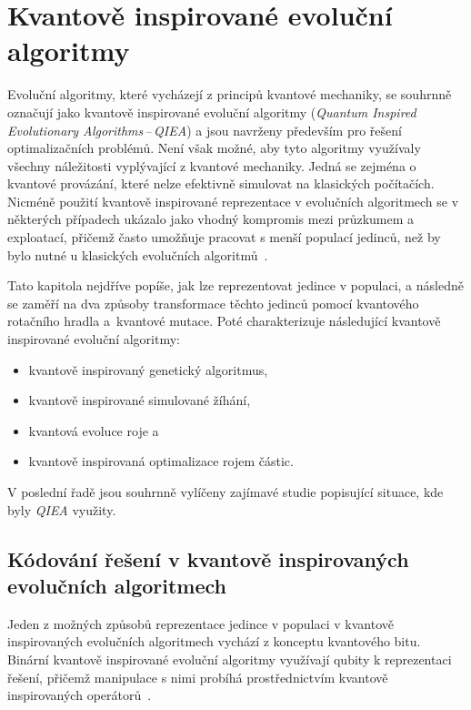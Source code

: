 \chapter{Kvantově inspirované evoluční algoritmy} \label{chapt:qiea}
Evoluční algoritmy, které vycházejí z principů kvantové mechaniky, se souhrnně označují jako kvantově inspirované evoluční algoritmy (\emph{Quantum Inspired Evolutionary Algorithms\,--\,QIEA}) a jsou navrženy především pro řešení optimalizačních problémů. 
Není však možné, aby tyto algoritmy využívaly všechny náležitosti vyplývající z kvantové mechaniky. 
Jedná se zejména o kvantové provázání, které nelze efektivně simulovat na klasických počítačích. 
Nicméně použití kvantově inspirované reprezentace v evolučních algoritmech se v některých případech ukázalo jako vhodný kompromis mezi průzkumem a exploatací, přičemž často umožňuje pracovat s menší populací jedinců, než by bylo nutné u klasických evolučních algoritmů~\cite{NaturalComputing}.

Tato kapitola nejdříve popíše, jak lze reprezentovat jedince v populaci, a následně se zaměří na dva způsoby transformace těchto jedinců pomocí kvantového rotačního hradla a~kvantové mutace. 
Poté charakterizuje následující kvantově inspirované evoluční algoritmy:
\begin{itemize}
    \item kvantově inspirovaný genetický algoritmus,
    \item kvantově inspirované simulované žíhání,
    \item kvantová evoluce roje a
    \item kvantově inspirovaná optimalizace rojem částic.
\end{itemize}
V poslední řadě jsou souhrnně vylíčeny zajímavé studie popisující situace, kde byly \emph{QIEA} využity. 

\section{Kódování řešení v kvantově inspirovaných evolučních algoritmech}
Jeden z možných způsobů reprezentace jedince v populaci v kvantově inspirovaných evolučních algoritmech vychází z konceptu kvantového bitu. 
Binární kvantově inspirované evoluční algoritmy využívají qubity k reprezentaci řešení, přičemž manipulace s nimi probíhá prostřednictvím kvantově inspirovaných operátorů~\cite{NaturalComputing}. 

